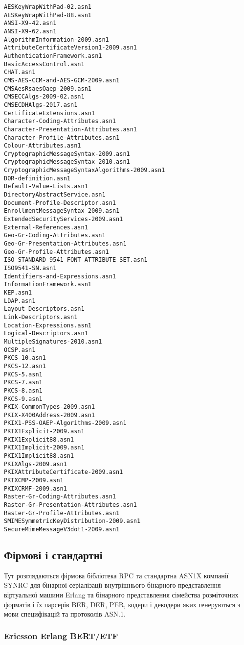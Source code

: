 \begin{lstlisting}
AESKeyWrapWithPad-02.asn1
AESKeyWrapWithPad-88.asn1
ANSI-X9-42.asn1
ANSI-X9-62.asn1
AlgorithmInformation-2009.asn1
AttributeCertificateVersion1-2009.asn1
AuthenticationFramework.asn1
BasicAccessControl.asn1
CHAT.asn1
CMS-AES-CCM-and-AES-GCM-2009.asn1
CMSAesRsaesOaep-2009.asn1
CMSECCAlgs-2009-02.asn1
CMSECDHAlgs-2017.asn1
CertificateExtensions.asn1
Character-Coding-Attributes.asn1
Character-Presentation-Attributes.asn1
Character-Profile-Attributes.asn1
Colour-Attributes.asn1
CryptographicMessageSyntax-2009.asn1
CryptographicMessageSyntax-2010.asn1
CryptographicMessageSyntaxAlgorithms-2009.asn1
DOR-definition.asn1
Default-Value-Lists.asn1
DirectoryAbstractService.asn1
Document-Profile-Descriptor.asn1
EnrollmentMessageSyntax-2009.asn1
ExtendedSecurityServices-2009.asn1
External-References.asn1
Geo-Gr-Coding-Attributes.asn1
Geo-Gr-Presentation-Attributes.asn1
Geo-Gr-Profile-Attributes.asn1
ISO-STANDARD-9541-FONT-ATTRIBUTE-SET.asn1
ISO9541-SN.asn1
Identifiers-and-Expressions.asn1
InformationFramework.asn1
KEP.asn1
LDAP.asn1
Layout-Descriptors.asn1
Link-Descriptors.asn1
Location-Expressions.asn1
Logical-Descriptors.asn1
MultipleSignatures-2010.asn1
OCSP.asn1
PKCS-10.asn1
PKCS-12.asn1
PKCS-5.asn1
PKCS-7.asn1
PKCS-8.asn1
PKCS-9.asn1
PKIX-CommonTypes-2009.asn1
PKIX-X400Address-2009.asn1
PKIX1-PSS-OAEP-Algorithms-2009.asn1
PKIX1Explicit-2009.asn1
PKIX1Explicit88.asn1
PKIX1Implicit-2009.asn1
PKIX1Implicit88.asn1
PKIXAlgs-2009.asn1
PKIXAttributeCertificate-2009.asn1
PKIXCMP-2009.asn1
PKIXCRMF-2009.asn1
Raster-Gr-Coding-Attributes.asn1
Raster-Gr-Presentation-Attributes.asn1
Raster-Gr-Profile-Attributes.asn1
SMIMESymmetricKeyDistribution-2009.asn1
SecureMimeMessageV3dot1-2009.asn1
\end{lstlisting}
\renewcommand{\footnotesize}{\normal}

\newpage
\subsection{Фірмові і стандартні}

Тут розглядаються фірмова бібліотека RPC та стандартна ASN1X компанії SYNRC для бінарної серіалізації внутрішнього бінарного представлення віртуальної машини Erlang та бінарного представлення сімейства розміточних форматів і їх парсерів BER, DER, PER, кодери і декодери яких генеруються з мови специфікацій та протоколів ASN.1.

\subsubsection{Ericsson Erlang BERT/ETF}

